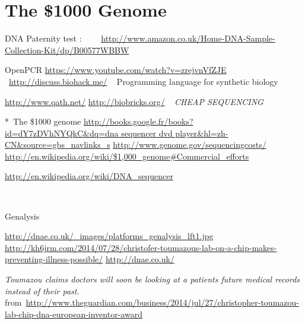 \section{The \$1000 Genome}


DNA Paternity test :
~~~~\url{http://www.amazon.co.uk/Home-DNA-Sample-Collection-Kit/dp/B00577WBBW}

\bigskip

OpenPCR
\url{https://www.youtube.com/watch?v=zrejvnVfZJE}
~\url{http://discuss.biohack.me/}
~
Programming language for synthetic biology

\url{http://www.qath.net/}
\url{http://biobricks.org/}
~
\textit{CHEAP SEQUENCING}

*~The \$1000 genome
\url{http://books.google.fr/books?id=dY7zDVhNYQkC&dq=dna sequencer dvd
player&hl=zh-CN&source=gbs_navlinks_s}
\url{http://www.genome.gov/sequencingcosts/}
\href{http://en.wikipedia.org/wiki/$1,000_genome#Commercial_efforts}{http://en.wikipedia.org/wiki/\$1,000\_genome\#Commercial\_efforts}

\bigskip
\url{http://en.wikipedia.org/wiki/DNA_sequencer}

~

\bigskip
Genalysis

\url{http://dnae.co.uk/_images/platforms_genalysis_lft1.jpg}
\url{http://kh6jrm.com/2014/07/28/christofer-toumazous-lab-on-a-chip-makes-preventing-illness-possible/}
\url{http://dnae.co.uk/}

\bigskip
\textit{{\textquotedbl}Toumazou claims doctors will soon be
looking at a patient{\textquotesingle}s future medical records instead
of their past.{\textquotedbl}}
from~\url{http://www.theguardian.com/business/2014/jul/27/christopher-toumazou-lab-chip-dna-european-inventor-award}

